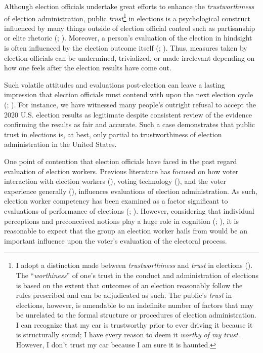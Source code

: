 \documentclass[
  12pt,
  letterpaper,
]{article}
\begin{document}
Although election officials undertake great efforts to enhance the
\emph{trustworthiness} of election administration, public
\emph{trust}\footnote{I adopt a distinction made between
  \emph{trustworthiness} and \emph{trust} in elections
  (). The ``\emph{worthiness}''
  of one's trust in the conduct and administration of elections is based
  on the extent that outcomes of an election reasonably follow the rules
  prescribed and can be adjudicated as such. The public's \emph{trust}
  in elections, however, is amendable to an indefinite number of factors
  that may be unrelated to the formal structure or procedures of
  election administration. I can recognize that my car is trustworthy
  prior to ever driving it because it is structurally sound; I have
  every reason to deem it \emph{worthy of my trust}. However, I don't
  trust my car because I am sure it is haunted.} in elections is a
psychological construct influenced by many things outside of election
official control such as partisanship or elite rhetoric
(;
). Moreover, a
person's evaluation of the election in hindsight is often influenced by
the election outcome itself (; ). Thus, measures
taken by election officials can be undermined, trivialized, or made
irrelevant depending on how one feels after the election results have
come out.

Such volatile attitudes and evaluations post-election can leave a
lasting impression that election officials must contend with upon the
next election cycle (;
). For instance,
we have witnessed many people's outright refusal to accept the 2020 U.S.
election results as legitimate despite consistent review of the evidence
confirming the results as fair and accurate. Such a case demonstrates
that public trust in elections is, at best, only partial to
trustworthiness of election administration in the United States.

One point of contention that election officials have faced in the past
regard evaluation of election workers. Previous literature has focused
on how voter interaction with election workers
(), voting technology
(), and the
voter experience generally (), influences evaluations of election administration. As
such, election worker competency has been examined as a factor
significant to evaluations of performance of elections
(;
).
However, considering that individual perceptions and preconceived
notions play a huge role in cognition (; ), it is reasonable to expect that the group an election worker
hails from would be an important influence upon the voter's evaluation
of the electoral process.
\end{document}
